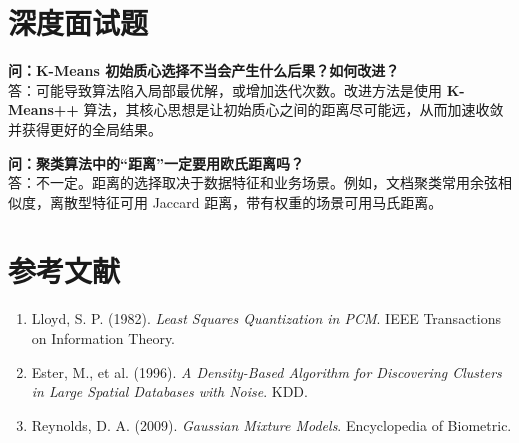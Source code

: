 \documentclass[12pt, a4paper]{article}
\begin{document}
\section{深度面试题}

\textbf{问：K-Means 初始质心选择不当会产生什么后果？如何改进？}\\
答：可能导致算法陷入局部最优解，或增加迭代次数。改进方法是使用 \textbf{K-Means++} 算法，其核心思想是让初始质心之间的距离尽可能远，从而加速收敛并获得更好的全局结果。

\textbf{问：聚类算法中的“距离”一定要用欧氏距离吗？}\\
答：不一定。距离的选择取决于数据特征和业务场景。例如，文档聚类常用余弦相似度，离散型特征可用 Jaccard 距离，带有权重的场景可用马氏距离。

\section{参考文献}
\begin{enumerate}
    \item Lloyd, S. P. (1982). \textit{Least Squares Quantization in PCM}. IEEE Transactions on Information Theory.
    \item Ester, M., et al. (1996). \textit{A Density-Based Algorithm for Discovering Clusters in Large Spatial Databases with Noise}. KDD.
    \item Reynolds, D. A. (2009). \textit{Gaussian Mixture Models}. Encyclopedia of Biometric.
\end{enumerate}
\end{document}
